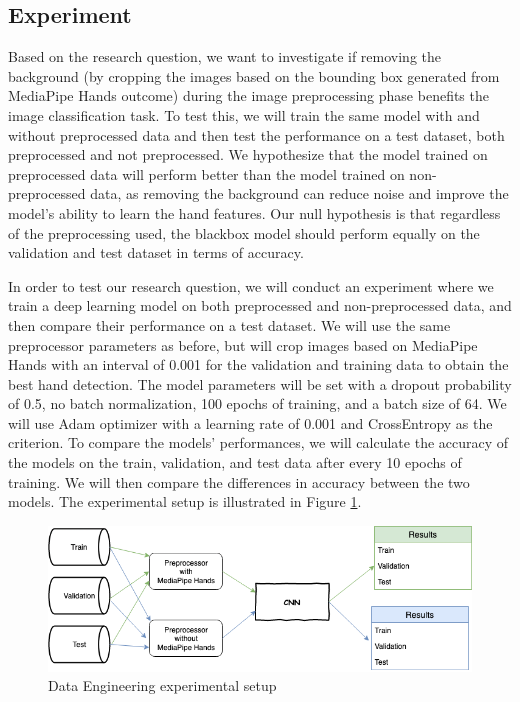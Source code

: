 \documentclass[a4paper]{article}
\begin{document}
\subsection{Experiment}

Based on the research question, we want to investigate if removing the background (by cropping the images based on the bounding box generated from MediaPipe Hands outcome) during the image preprocessing phase benefits the image classification task. To test this, we will train the same model with and without preprocessed data and then test the performance on a test dataset, both preprocessed and not preprocessed. We hypothesize that the model trained on preprocessed data will perform better than the model trained on non-preprocessed data, as removing the background can reduce noise and improve the model's ability to learn the hand features. Our null hypothesis is that regardless of the preprocessing used, the blackbox model should perform equally on the validation and test dataset in terms of accuracy.



In order to test our research question, we will conduct an experiment where we train a deep learning model on both preprocessed and non-preprocessed data, and then compare their performance on a test dataset. We will use the same preprocessor parameters as before, but will crop images based on MediaPipe Hands with an interval of 0.001 for the validation and training data to obtain the best hand detection. The model parameters will be set with a dropout probability of 0.5, no batch normalization, 100 epochs of training, and a batch size of 64. We will use Adam optimizer with a learning rate of 0.001 and CrossEntropy as the criterion. To compare the models' performances, we will calculate the accuracy of the models on the train, validation, and test data after every 10 epochs of training. We will then compare the differences in accuracy between the two models. The experimental setup is illustrated in Figure \ref{fig:exp-de-setup}.


\begin{figure}
    \includegraphics[width=.95\textwidth]{img/experiment/Experiment_Setup.png}
    \caption{Data Engineering experimental setup}
    \label{fig:exp-de-setup}
\end{figure}
\end{document}
